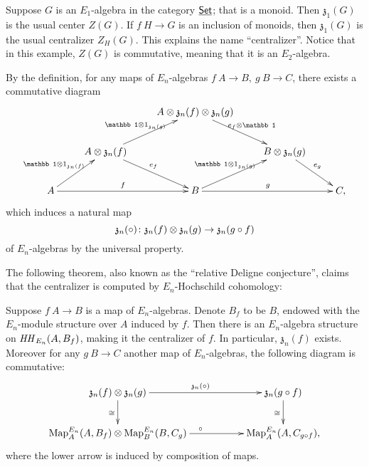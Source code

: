 \documentclass[twoside]{article}
\begin{document}
\begin{example}
    Suppose $G$ is an $E_1$-algebra in the category $\underline{\smash{\mathsf{Set}}}$; that is a monoid.
    Then $\mathfrak z_1(G)$ is the usual center $Z(G)$. If $f\:H\to G$ is
    an inclusion of monoids, then $\mathfrak z_1(G)$ is the usual centralizer 
    $Z_H(G)$. This explains the name ``centralizer''. Notice that in this example,
    $Z(G)$ is commutative, meaning that it is an $E_2$-algebra.
\end{example}

\begin{remark}
    By the definition, for any maps of $E_n$-algebras $f\:A\to B,\ g\:B\to C$,
    there exists a commutative diagram $$\xymatrix{
    &&A\ox\mathfrak z_n(f)\ox\mathfrak z_n(g)\ar[rd]^{e_f\ox\mathbb1}&&\\
    &A\ox\mathfrak z_n(f)\ar[ru]^{\mathbb1\ox1_{\mathfrak z_n(g)}}
    \ar[rd]^{e_f}&&B\ox\mathfrak z_n(g)\ar[rd]^{e_g}&\\
    A\ar[rr]^f\ar[ru]^{\mathbb1\ox1_{\mathfrak z_n(f)}}&&B\ar[rr]^g
    \ar[ru]^{\mathbb1\ox1_{\mathfrak z_n(g)}}&&C,}$$ which induces a natural map
    $$\mathfrak z_n(\circ)\colon\mathfrak z_n(f)\otimes\mathfrak z_n(g)
    \to\mathfrak z_n(g\circ f)$$ of $E_n$-algebras by the universal property.
\end{remark}

The following theorem, also known as the ``relative Deligne conjecture'',
claims that the centralizer is computed by $E_n$-Hochschild cohomology:

\begin{theorem}
    Suppose $f\:A\to B$ is a map of $E_n$-algebras. Denote $B_f$ to be $B$, endowed
    with the $E_n$-module structure over $A$ induced by $f$. Then there is an
    $E_n$-algebra structure on $\mathit{HH}_{E_n}(A,B_f)$, making it the centralizer of
    $f$. In particular, $\mathfrak z_n(f)$ exists. Moreover for any $g\:B\to C$
    another map of $E_n$-algebras, the following diagram is commutative:
    $$\xymatrix{
    \mathfrak z_n(f)\ox\mathfrak z_n(g)\ar[d]_{\cong}\ar[rr]^{\mathfrak z_n(\circ)}
    &&\mathfrak z_n(g\circ f)\ar[d]_{\cong}\\\Map_A^{E_n}(A,B_f)
    \ox\Map_B^{E_n}(B,C_g)\ar[rr]^\circ&&\Map_A^{E_n}(A,C_{g\circ f}),}$$ where 
    the lower arrow is induced by composition of maps.
\end{theorem}
\end{document}
